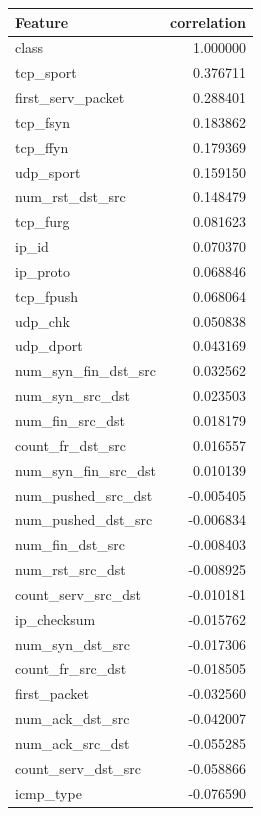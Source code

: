 \begin{table}[!htb]
    \centering
    \begin{tabular}{lr}
\toprule
Feature & correlation\\\midrule
class&                    1.000000\\
tcp\_sport&                0.376711\\
first\_serv\_packet&        0.288401\\
tcp\_fsyn&                 0.183862\\
tcp\_ffyn&                 0.179369\\
udp\_sport&                0.159150\\
num\_rst\_dst\_src&          0.148479\\
tcp\_furg&                 0.081623\\
ip\_id&                    0.070370\\
ip\_proto&                 0.068846\\
tcp\_fpush&                0.068064\\
udp\_chk&                  0.050838\\
udp\_dport&                0.043169\\
num\_syn\_fin\_dst\_src&      0.032562\\
num\_syn\_src\_dst&          0.023503\\
num\_fin\_src\_dst&          0.018179\\
count\_fr\_dst\_src&         0.016557\\
num\_syn\_fin\_src\_dst&      0.010139\\
num\_pushed\_src\_dst&      -0.005405\\
num\_pushed\_dst\_src&      -0.006834\\
num\_fin\_dst\_src&         -0.008403\\
num\_rst\_src\_dst&         -0.008925\\
count\_serv\_src\_dst&      -0.010181\\
ip\_checksum&             -0.015762\\
num\_syn\_dst\_src&         -0.017306\\
count\_fr\_src\_dst&        -0.018505\\
first\_packet&            -0.032560\\
num\_ack\_dst\_src&         -0.042007\\
num\_ack\_src\_dst&         -0.055285\\
count\_serv\_dst\_src&      -0.058866\\
icmp\_type&               -0.076590\\

\end{tabular}
\end{table}
